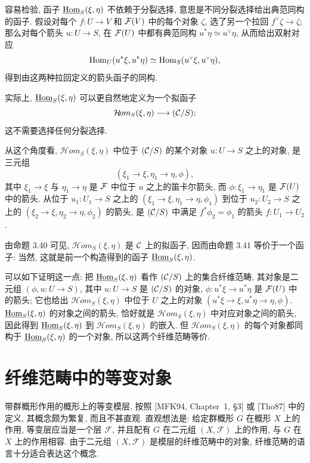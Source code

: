 容易检验, 函子 $\underline{\operatorname{Hom}}_S(\xi,\eta)$ 不依赖于分裂选择, 意思是不同分裂选择给出典范同构的函子. 假设对每个 $f:U\to V$ 和 $\mathcal F(V)$ 中的每个对象 $\zeta$, 选了另一个拉回 $f^{\scriptscriptstyle\vee}\zeta\to\zeta$; 那么对每个箭头 $u:U\to S$, 在 $\mathcal F(U)$ 中都有典范同构 $u^*\eta\simeq u^{\scriptscriptstyle\vee}\eta$, 从而给出双射对应
\[
\operatorname{Hom}_U(u^*\xi,u^*\eta)\simeq\operatorname{Hom}_S(u^{\scriptscriptstyle\vee}\xi,u^{\scriptscriptstyle\vee}\eta),
\]
得到由这两种拉回定义的箭头函子的同构.

实际上, $\underline{\operatorname{Hom}}_S(\xi,\eta)$ 可以更自然地定义为一个拟函子
\[
\mathcal H\!om_S(\xi,\eta)\longrightarrow(\mathcal C/S);
\]
这不需要选择任何分裂选择.

从这个角度看, $\mathcal H\!om_S(\xi,\eta)$ 中位于 $(\mathcal C/S)$ 的某个对象 $u:U\to S$ 之上的对象, 是三元组
\[
(\xi_1\longrightarrow\xi,\eta_1\longrightarrow\eta,\phi),
\]
其中 $\xi_1\to\xi$ 与 $\eta_1\to\eta$ 是 $\mathcal F$ 中位于 $u$ 之上的笛卡尔箭头, 而 $\phi:\xi_1\to\eta_1$ 是 $\mathcal F(U)$ 中的箭头. 从位于 $u_1:U_1\to S$ 之上的 $(\xi_1\to\xi,\eta_1\to\eta,\phi_1)$ 到位于 $u_2:U_2\to S$ 之上的 $(\xi_2\to\xi,\eta_2\to\eta,\phi_2)$ 的箭头, 是 $(\mathcal C/S)$ 中满足 $f^*\phi_2=\phi_1$ 的箭头 $f:U_1\to U_2$.

由命题 3.40 可见, $\mathcal H\!om_S(\xi,\eta)$ 是 $\mathcal C$ 上的拟函子, 因而由命题 3.41 等价于一个函子: 当然, 这就是前一个构造得到的函子 $\underline{\operatorname{Hom}}_S(\xi,\eta)$.

可以如下证明这一点: 把 $\underline{\operatorname{Hom}}_S(\xi,\eta)$ 看作 $(\mathcal C/S)$ 上的集合纤维范畴, 其对象是二元组 $(\phi,u:U\to S)$, 其中 $u:U\to S$ 是 $(\mathcal C/S)$ 的对象, $\phi:u^*\xi\to u^*\eta$ 是 $\mathcal F(U)$ 中的箭头; 它也给出 $\mathcal H\!om_S(\xi,\eta)$ 中位于 $U$ 之上的对象 $(u^*\xi\to\xi,u^*\eta\to\eta,\phi)$. $\underline{\operatorname{Hom}}_S(\xi,\eta)$ 的对象之间的箭头, 恰好就是 $\mathcal H\!om_S(\xi,\eta)$ 中对应对象之间的箭头, 因此得到 $\underline{\operatorname{Hom}}_S(\xi,\eta)$ 到 $\mathcal H\!om_S(\xi,\eta)$ 的嵌入. 但 $\mathcal H\!om_S(\xi,\eta)$ 的每个对象都同构于 $\underline{\operatorname{Hom}}_S(\xi,\eta)$ 的一个对象, 所以这两个纤维范畴等价.

\section{纤维范畴中的等变对象}
\label{ch03:sec38}
带群概形作用的概形上的等变模层, 按照 [MFK94, Chapter~1, \S3] 或 [Tho87] 中的定义, 其概念颇为繁复, 而且不甚直观. 直观想法是: 给定群概形 $G$ 在概形 $X$ 上的作用, 等变层应当是一个层 $\mathcal F$, 并且配有 $G$ 在二元组 $(X,\mathcal F)$ 上的作用, 与 $G$ 在 $X$ 上的作用相容. 由于二元组 $(X,\mathcal F)$ 是模层的纤维范畴中的对象, 纤维范畴的语言十分适合表达这个概念.

